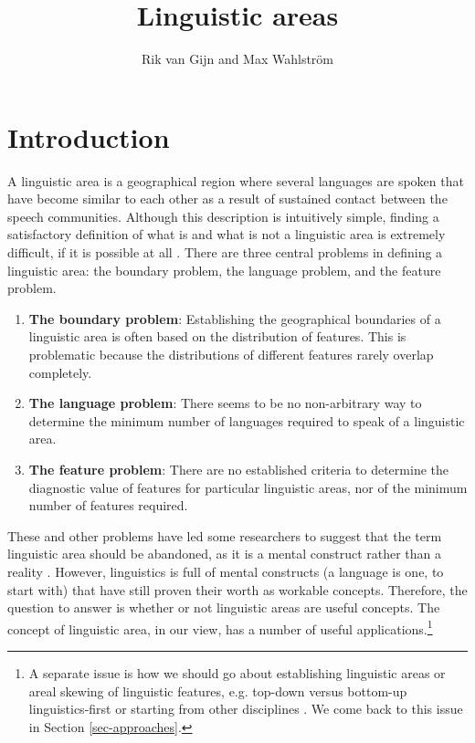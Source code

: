 \documentclass[output=paper]{langscibook}
\title{Linguistic areas}
\author{Rik van Gijn\affiliation{Leiden University} and  Max Wahlström\affiliation{University of Helsinki}}
\begin{document}
\maketitle 
\label{chap_areas}

\section{Introduction}


A linguistic area is a geographical region where several languages are spoken that have become similar to each other as a result of sustained contact between the speech communities. Although this description is intuitively simple, finding a satisfactory definition of what is and what is not a linguistic area is extremely difficult, if it is possible at all \parencite[see, e.g.,][]{Masica2001Definition, Stolz2002No, Stolz2006All, Campbell2006Linguistic, campbell2017why}. There are three central problems in defining a linguistic area: the boundary problem, the language problem, and the feature problem.

\begin{enumerate}
\item \textbf{The boundary problem}: Establishing the geographical boundaries of a linguistic area is often based on the distribution of features. This is problematic because the distributions of different features rarely overlap completely. 
\item \textbf{The language problem}: There seems to be no non-arbitrary way to determine the minimum number of languages required to speak of a linguistic area.
\item \textbf{The feature problem}: There are no established criteria to determine the diagnostic value of features for particular linguistic areas, nor of the minimum number of features required.
\end{enumerate}

These and other problems have led some researchers to suggest that the term linguistic area should be abandoned, as it is a mental construct rather than a reality \parencite[see in particular][]{Stolz2006All, Campbell2006Linguistic, campbell2017why}. However, linguistics is full of mental constructs (a language is one, to start with) that have still proven their worth as workable concepts. Therefore, the question to answer is whether or not linguistic areas are useful concepts. The concept of linguistic area, in our view, has a number of useful applications.\footnote{A separate issue is how we should go about establishing linguistic areas or areal skewing of linguistic features, e.g. top-down versus bottom-up \parencite{Muyskenetal2014Linguistic, campbell2017why} linguistics-first or starting from other disciplines \parencite{Stolz2006All, GijnForthcSeparating}. We come back to this issue in Section \ref{sec-approaches}.}
\end{document}
